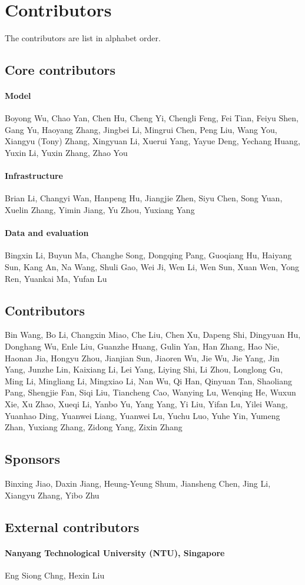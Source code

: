 \section{Contributors}
The contributors are list in alphabet order. 
\subsection{Core contributors}
\paragraph{Model}
Boyong Wu,
Chao Yan,
Chen Hu,
Cheng Yi,
Chengli Feng,
Fei Tian,
Feiyu Shen, 
Gang Yu,
Haoyang Zhang,
Jingbei Li,
Mingrui Chen, 
Peng Liu,
Wang You,
Xiangyu (Tony) Zhang,
Xingyuan Li,
Xuerui Yang,
Yayue Deng,
Yechang Huang,
Yuxin Li,
Yuxin Zhang,
Zhao You

\paragraph{Infrastructure}
Brian Li, %
Changyi Wan,
Hanpeng Hu,
Jiangjie Zhen,
Siyu Chen,
Song Yuan,
Xuelin Zhang,
Yimin Jiang,
Yu Zhou,
Yuxiang Yang

\paragraph{Data and evaluation}
Bingxin Li, %
Buyun Ma, %
Changhe Song, %
Dongqing Pang, %
Guoqiang Hu, %
Haiyang Sun, %
Kang An, %
Na Wang, %
Shuli Gao, %
Wei Ji,  %
Wen Li, %
Wen Sun, %
Xuan Wen, %
Yong Ren, %
Yuankai Ma, %
Yufan Lu %

\subsection{Contributors}
Bin Wang, %
Bo Li, %
Changxin Miao, %
Che Liu, %
Chen Xu, %
Dapeng Shi, %
Dingyuan Hu, %
Donghang Wu, %
Enle Liu, %
Guanzhe Huang, %
Gulin Yan, %
Han Zhang,
Hao Nie, %
Haonan Jia, %
Hongyu Zhou, %
Jianjian Sun, %
Jiaoren Wu, %
Jie Wu, %
Jie Yang, %
Jin Yang, %
Junzhe Lin, %
Kaixiang Li, %
Lei Yang,
Liying Shi, %
Li Zhou, %
Longlong Gu, %
Ming Li, %
Mingliang Li, %
Mingxiao Li, %
Nan Wu, %
Qi Han,
Qinyuan Tan, %
Shaoliang Pang, %
Shengjie Fan, %
Siqi Liu, %
Tiancheng Cao, %
Wanying Lu, %
Wenqing He, %
Wuxun Xie, %
Xu Zhao, %
Xueqi Li, %
Yanbo Yu, %
Yang Yang, %
Yi Liu, %
Yifan Lu, %
Yilei Wang, %
Yuanhao Ding, %
Yuanwei Liang, %
Yuanwei Lu, %
Yuchu Luo, %
Yuhe Yin, %
Yumeng Zhan, %
Yuxiang Zhang, %
Zidong Yang, %
Zixin Zhang %

\subsection{Sponsors}
Binxing Jiao,
Daxin Jiang,
Heung-Yeung Shum,
Jiansheng Chen,
Jing Li,
Xiangyu Zhang,
Yibo Zhu

\subsection{External contributors}
\paragraph{Nanyang Technological University (NTU), Singapore}
Eng Siong Chng,
Hexin Liu
\newpage
